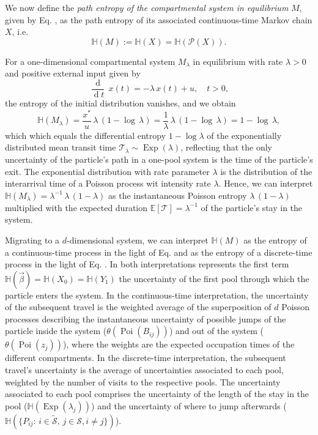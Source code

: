 \documentclass[smallextended]{svjour3}
\makeatletter
\renewcommand*{\eqref}[1]{%
  \hyperref[{#1}]{\textup{\tagform@{\ref*{#1}}}}%
}
\newcommand{\E}{\mathbb{E}}
\newcommand{\TT}{\mathcal{T}}
\renewcommand{\H}{\mathbb{H}}
\newcommand{\Exp}{\operatorname{Exp}}
\newcommand{\Poi}{\operatorname{Poi}}
\newcommand{\deriv}[1]{\frac{\operatorname{d}}{\operatorname{d}#1}}
\makeatother
\begin{document}
We now define the \emph{path entropy of the compartmental system in equilibrium} $M$, given by Eq. \eqref{eqn:lin_CS_sys}, as the path entropy of its associated continuous-time Markov chain $X$, i.e.
\begin{equation*}
  \H(M):=\H(X)=\H(\mathcal{P}(X)).
\end{equation*}

For a one-dimensional compartmental system $M_\lambda$ in equilibrium with rate $\lambda>0$ and positive external input given by
\begin{equation}
  \deriv{t}\,x(t) = -\lambda\,x(t) + u,\quad t>0,
\end{equation}
the entropy of the initial distribution vanishes, and we obtain
\begin{equation*}
  \H(M_\lambda) = \frac{x^\ast}{u}\,\lambda\,(1-\log\,\lambda) = \frac{1}{\lambda}\,\lambda\,(1-\log\,\lambda) = 1-\log\,\lambda,
\end{equation*}  
which which equals the differential entropy $1-\log\lambda$ of the exponentially distributed mean transit time $\TT_\lambda\sim\Exp(\lambda)$, reflecting that the only uncertainty of the particle's path in a one-pool system is the time of the particle's exit.
The exponential distribution with rate parameter $\lambda$ is the distribution of the interarrival time of a Poisson process wit intensity rate $\lambda$.
Hence, we can interpret $\H(M_\lambda) = \lambda^{-1}\,\lambda\,(1-\lambda)$ as the instantaneous Poisson entropy $\lambda\,(1-\lambda)$ multiplied with the expected duration $\E\left[\TT\right]=\lambda^{-1}$ of the particle's stay in the system.

Migrating to a $d$-dimensional system, we can interpret $\H(M)$ as the entropy of a continuous-time process in the light of Eq. \eqref{eqn:H_occupation_time} and as the entropy of a discrete-time process in the light of Eq. \eqref{eqn:H_number_of_visits}.
In both interpretations represents the first term $\H(\vec{\beta})=\H(X_0)=\H(Y_1)$ the uncertainty of the first pool through which the particle enters the system.
In the continuous-time interpretation, the uncertainty of the subsequent travel is the weighted average of the superposition of $d$ Poisson processes describing the instantaneous uncertainty of possible jumps of the particle inside the system ($\theta(\Poi(B_{ij}))$) and out of the system ($\theta(\Poi(z_j))$), where the weights are the expected occupation times of the different compartments. 
In the discrete-time interpretation, the subsequent travel's uncertainty is the average of uncertainties associated to each pool, weighted by the number of visits to the respective pools.
The uncertainty associated to each pool comprises the uncertainty of the length of the stay in the pool ($\H(\Exp(\lambda_j))$) and the uncertainty of where to jump afterwards ($\H(\{P_{ij}:\,i\in\widetilde{\mathcal{S}},\,j\in\mathcal{S},i\neq j\})$).
\end{document}
